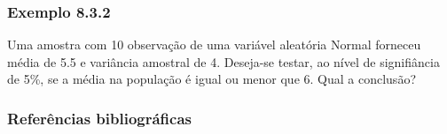 \documentclass[11pt]{beamer}
\begin{document}
\begin{frame}
\frametitle{Exemplo 8.3.2}
Uma amostra com 10 observação de uma variável aleatória Normal forneceu média de 5.5 e variância amostral de 4. Deseja-se testar, ao nível de signifiância de 5\%, se a média na população é igual ou menor que 6. Qual a conclusão?
\vspace{1in}
\vspace{1in}

\end{frame}

\begin{frame}
\frametitle{Referências bibliográficas}
\printbibliography
\end{frame}
\end{document}
